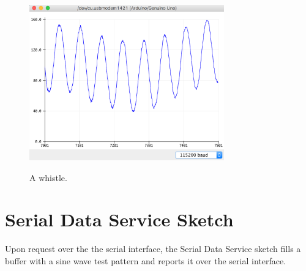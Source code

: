 \documentclass[12pt]{article}
\begin{document}
\begin{figure}[htbp]
\begin{center}
{\includegraphics[width=0.75\textwidth]{figs/whistle.png}}
\end{center}
\caption{\label{fig:whistle} A whistle.}
\end{figure}

\section{Serial Data Service Sketch}

Upon request over the the serial interface, the Serial Data Service sketch fills a buffer with a sine wave test pattern and reports it over the serial interface.
\end{document}

